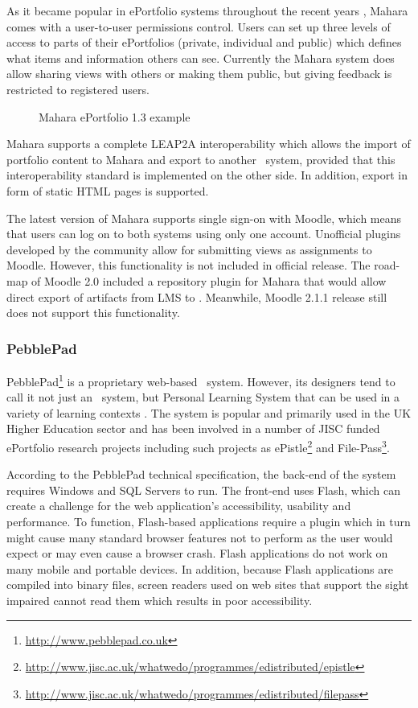 As it became popular in ePortfolio systems throughout the recent years
\citep{Waters2009}, Mahara comes with a user-to-user permissions control. Users
can set up three levels of access to parts of their ePortfolios (private,
individual and public) which defines what items and information others can see.
Currently the Mahara system does allow sharing views with others or making them
public, but giving feedback is restricted to registered users.

\begin{figure}[htb]
\centering
\setlength\fboxsep{0pt}
\setlength\fboxrule{0.5pt}
\caption{Mahara ePortfolio 1.3 example}
\label{fig:maharaep}
\end{figure}

Mahara supports a complete LEAP2A interoperability which allows the import of
portfolio content to Mahara and export to another \ep~system, provided that
this interoperability standard is implemented on the other side. In addition,
export in form of static HTML pages is supported.

The latest version of Mahara supports single sign-on with Moodle, which means
that users can log on to both systems using only one account. Unofficial plugins
developed by the community allow for submitting views as assignments to Moodle.
However, this functionality is not included in official release. The road-map of
Moodle 2.0 included a repository plugin for Mahara that would allow direct
export of artifacts from LMS to \ep. Meanwhile, Moodle 2.1.1 release still does
not support this functionality.

\subsubsection{PebblePad}

PebblePad\footnote{\url{http://www.pebblepad.co.uk}} is a proprietary web-based
\ep~system. However, its designers tend to call it not just an \ep~system, but
Personal Learning System that can be used in a variety of learning contexts
\citep{PebbleLearningLtd2010}. The system is popular and primarily used in the
UK Higher Education sector and has been involved in a number of JISC funded
ePortfolio research projects including such projects as 
ePistle\footnote{\url{http://www.jisc.ac.uk/whatwedo/programmes/edistributed/epistle}}
and File-Pass\footnote{\url{http://www.jisc.ac.uk/whatwedo/programmes/edistributed/filepass}}.

According to the PebblePad technical specification, the back-end of the system
requires Windows and SQL Servers to run. The front-end uses Flash, which can
create a challenge for the web application's accessibility, usability and
performance. To function, Flash-based applications require a plugin which in
turn might cause many standard browser features not to perform as the user would
expect or may even cause a browser crash. Flash applications do not work on many
mobile and portable devices. In addition, because Flash applications are
compiled into binary files, screen readers used on web sites that support the
sight impaired cannot read them which results in poor accessibility.

